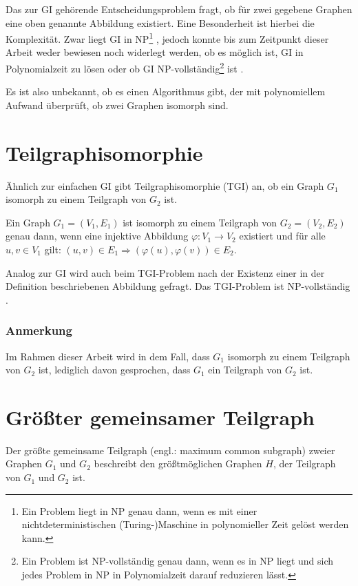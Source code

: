 Das zur GI gehörende Entscheidungsproblem fragt, ob für zwei gegebene 
Graphen eine oben genannte Abbildung existiert. Eine Besonderheit ist 
hierbei die Komplexität. Zwar liegt GI in NP\footnote{Ein Problem liegt 
in NP genau dann, wenn es mit einer nichtdeterministischen (Turing-)Maschine 
in polynomieller Zeit gelöst werden kann.} \cite{GIinNP}, jedoch konnte bis 
zum Zeitpunkt dieser Arbeit weder bewiesen noch widerlegt werden, ob es 
möglich ist, GI in Polynomialzeit zu lösen oder ob GI NP-vollständig\footnote{Ein 
Problem ist NP-vollständig genau dann, wenn es in NP liegt und sich jedes 
Problem in NP in Polynomialzeit darauf reduzieren lässt.} ist \cite{wikiD:GI,wikiE:GI}. 

Es ist also unbekannt, ob es einen Algorithmus gibt, der 
mit polynomiellem Aufwand überprüft, ob zwei Graphen isomorph sind.


\section{Teilgraphisomorphie}
Ähnlich zur einfachen GI gibt Teilgraphisomorphie (TGI) an, ob ein Graph 
$G_1$ isomorph zu einem Teilgraph von $G_2$ ist.

\begin{mydef}[Teilgraphisomorphie]
Ein Graph $G_1 = (V_1,E_1)$ ist isomorph zu einem Teilgraph von $G_2 =
(V_2,E_2)$ genau dann, wenn eine injektive Abbildung $\varphi: V_1
\rightarrow V_2$ existiert und für alle $u,v \in V_1$ gilt: $(u,v) \in E_1
\Rightarrow (\varphi(u),\varphi(v)) \in E_2$.
\end{mydef}

Analog zur GI wird auch beim TGI-Problem nach der Existenz einer in der 
Definition beschriebenen Abbildung gefragt. Das TGI-Problem ist 
NP-vollständig \cite{Cook:1971}.

\subsubsection{Anmerkung}
Im Rahmen dieser Arbeit wird in dem Fall, dass $G_1$ isomorph zu einem 
Teilgraph von $G_2$ ist, lediglich davon gesprochen, dass $G_1$ ein 
Teilgraph von $G_2$ ist. 


\section{Größter gemeinsamer Teilgraph}
Der größte gemeinsame Teilgraph (engl.: maximum common subgraph) 
zweier Graphen $G_1$ und $G_2$ beschreibt den größtmöglichen Graphen $H$, 
der Teilgraph von $G_1$ und $G_2$ ist.

